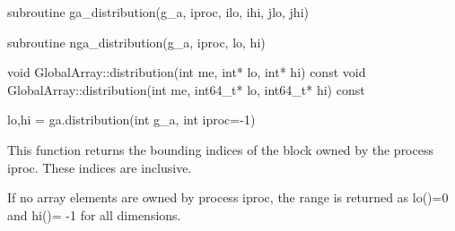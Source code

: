 \documentclass[12pt]{article}
\begin{document}
\begin{f2dapi}
\begin{fcode}
subroutine ga_distribution(g_a, iproc, ilo, ihi, jlo, jhi)
\end{fcode}
\begin{funcargs}
\end{funcargs}
\end{f2dapi}

\begin{fapi}
\begin{fcode}
subroutine nga_distribution(g_a, iproc, lo, hi)
\end{fcode}
\begin{funcargs}
\end{funcargs}
\end{fapi}

\begin{cxxapi}
\begin{cxxcode}
void GlobalArray::distribution(int me, int* lo, int* hi) const
void GlobalArray::distribution(int me, int64_t* lo, int64_t* hi) const
\end{cxxcode}
\begin{funcargs}
\end{funcargs}
\end{cxxapi}

\begin{pyapi}
\begin{pycode}
lo,hi = ga.distribution(int g_a, int iproc=-1)
\end{pycode}
\begin{funcargs}
\end{funcargs}
\end{pyapi}

\local

\begin{fdesc}
This function returns the bounding indices of the block owned by the process
iproc. These indices are inclusive.

If no array elements are owned by process iproc, the range is returned as
lo()=0 and hi()= -1 for all dimensions.
\end{fdesc}
\end{document}

